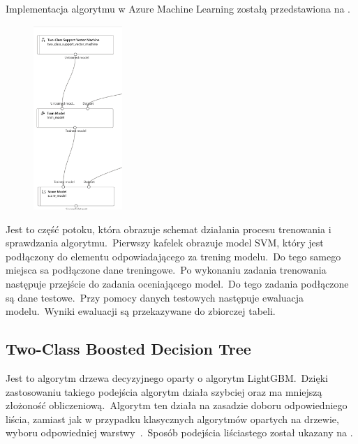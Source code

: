 Implementacja algorytmu w Azure Machine Learning zostałą przedstawiona na .

\begin{figure}[H]
    \centering
    \includegraphics[width=0.3\textwidth]{images/svm_pipe}
    \label{fig:svm-pipe}
\end{figure}

Jest to część potoku, która obrazuje schemat działania procesu trenowania i sprawdzania algorytmu.\ Pierwszy kafelek obrazuje model SVM, który jest podłączony do elementu odpowiadającego za trening modelu.\ Do tego samego miejsca sa podłączone dane treningowe.\ Po wykonaniu zadania trenowania następuje przejście do zadania oceniającego model.\ Do tego zadania podłączone są dane testowe.\ Przy pomocy danych testowych następuje ewaluacja modelu.\ Wyniki ewaluacji są przekazywane do zbiorczej tabeli.

\subsection{Two-Class Boosted Decision Tree}
Jest to algorytm drzewa decyzyjnego oparty o algorytm LightGBM.\ Dzięki zastosowaniu takiego podejścia algorytm działa szybciej oraz ma mniejszą złożoność obliczeniową.\ Algorytm ten działa na zasadzie doboru odpowiedniego liścia, zamiast jak w przypadku klasycznych algorytmów opartych na drzewie, wyboru odpowiedniej warstwy~\cite{LightGBM}.\ Sposób podejścia liściastego został ukazany na .

